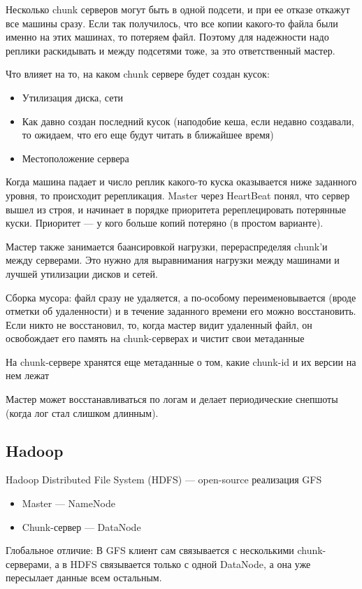 \documentclass[12pt]{article}
\begin{document}
    \quad Несколько chunk серверов могут быть в одной подсети, и при ее отказе откажут все машины сразу. Если так получилось, что все копии какого-то файла были именно на этих машинах, то потеряем файл. Поэтому для надежности надо реплики раскидывать и между подсетями тоже, за это ответственный мастер.
    
    \quad Что влияет на то, на каком chunk сервере будет создан кусок:
    \begin{itemize}
        \item Утилизация диска, сети
        \item Как давно создан последний кусок (наподобие кеша, если недавно создавали, то ожидаем, что его еще будут читать в ближайшее время)
        \item Местоположение сервера
    \end{itemize}
    
    \quad Когда машина падает и число реплик какого-то куска оказывается ниже заданного уровня, то происходит ререпликация. Master через HeartBeat понял, что сервер вышел из строя, и начинает в порядке приоритета ререплецировать потерянные куски. Приоритет --- у кого больше копий потеряно (в простом варианте).

    \quad Мастер также занимается баансировкой нагрузки, перераспределяя chunk'и между серверами. Это нужно для выравнимания нагрузки между машинами и лучшей утилизации дисков и сетей.

    \quad Сборка мусора: файл сразу не удаляется, а по-особому переименовывается (вроде отметки об удаленности) и в течение заданного времени его можно восстановить. Если никто не восстановил, то, когда мастер видит удаленный файл, он освобождает его память на chunk-серверах и чистит свои метаданные
    
    \quad На chunk-сервере хранятся еще метаданные о том, какие chunk-id и их версии на нем лежат
    
    \quad Мастер может восстанавливаться по логам и делает периодические снепшоты (когда лог стал слишком длинным).

\subsection{Hadoop}
    \quad Hadoop Distributed File System (HDFS) --- open-source реализация GFS
    \begin{itemize}
        \item Master --- NameNode
        \item Chunk-сервер --- DataNode
    \end{itemize}
    \quad Глобальное отличие: В GFS клиент сам связывается с несколькими chunk-серверами, а в HDFS связывается только с одной DataNode, а она уже пересылает данные всем остальным.
    
\end{document}
